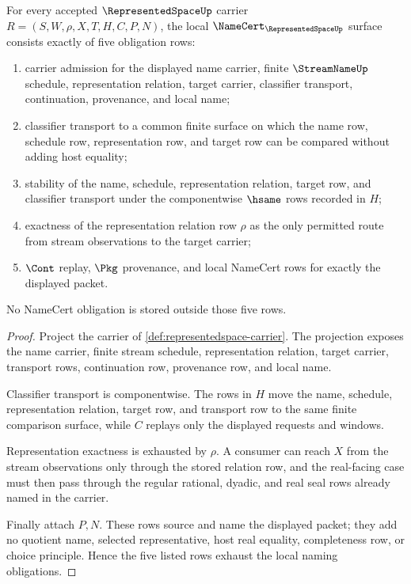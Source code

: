 \begin{theorem}
\label{thm:representedspace-namecert-obligations}
For every accepted $\RepresentedSpaceUp$ carrier
$R=(S,W,\rho,X,T,H,C,P,N)$, the local
$\NameCert_{\RepresentedSpaceUp}$ surface consists exactly of five obligation
rows:
\begin{enumerate}
\item carrier admission for the displayed name carrier, finite
$\StreamNameUp$ schedule, representation relation, target carrier, classifier
transport, continuation, provenance, and local name;
\item classifier transport to a common finite surface on which the name row,
schedule row, representation row, and target row can be compared without adding
host equality;
\item stability of the name, schedule, representation relation, target row, and
classifier transport under the componentwise $\hsame$ rows recorded in $H$;
\item exactness of the representation relation row $\rho$ as the only permitted
route from stream observations to the target carrier;
\item $\Cont$ replay, $\Pkg$ provenance, and local NameCert rows for exactly the
displayed packet.
\end{enumerate}
No NameCert obligation is stored outside those five rows.
\end{theorem}
\begin{proof}
Project the carrier of \autoref{def:representedspace-carrier}. The projection
exposes the name carrier, finite stream schedule, representation relation,
target carrier, transport rows, continuation row, provenance row, and local
name.

Classifier transport is componentwise. The rows in $H$ move the name, schedule,
representation relation, target row, and transport row to the same finite
comparison surface, while $C$ replays only the displayed requests and windows.

Representation exactness is exhausted by $\rho$. A consumer can reach $X$ from
the stream observations only through the stored relation row, and the real-facing
case must then pass through the regular rational, dyadic, and real seal rows
already named in the carrier.

Finally attach $P,N$. These rows source and name the displayed packet; they add
no quotient name, selected representative, host real equality, completeness row,
or choice principle. Hence the five listed rows exhaust the local naming
obligations.
\end{proof}

